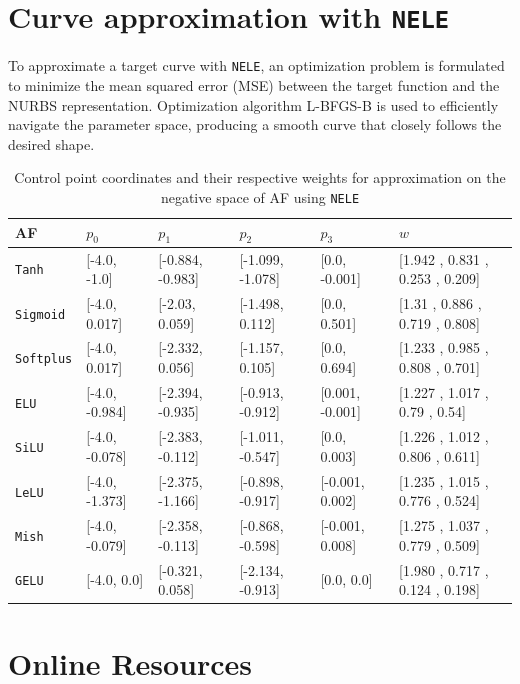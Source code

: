 \documentclass{article}
\begin{document}
\section{Curve approximation with \texttt{NELE}\label{app:nurbsparams}}
To approximate a target curve with \texttt{NELE}, an optimization problem is formulated to minimize the mean squared error (MSE) between the target function and the NURBS representation.
Optimization algorithm L-BFGS-B \cite{scipy_optimize_minimize} is used to efficiently navigate the parameter space, 
producing a smooth curve that closely follows the desired shape.
\begin{table}[H]
  \caption{Control point coordinates and their respective weights for approximation on the negative space of AF using \texttt{NELE}}
  \label{tab:curveapprox}
  \centering
\scriptsize
  \begin{tabular}{@{}llllll@{}}
    \toprule
    AF&$p_0$&$p_1$&$p_2$&$p_3$&$w$\\
    \midrule
    \texttt{Tanh} & [-4.0, -1.0] &    [-0.884, -0.983] &    [-1.099, -1.078] &    [0.0, -0.001] &    [1.942 , 0.831 , 0.253 , 0.209]\\
    \texttt{Sigmoid} & [-4.0, 0.017] &    [-2.03, 0.059] &    [-1.498, 0.112] &    [0.0, 0.501] &    [1.31 , 0.886 , 0.719 , 0.808]\\
    \texttt{Softplus} & [-4.0, 0.017] &    [-2.332, 0.056] &    [-1.157, 0.105] &    [0.0, 0.694] &    [1.233 , 0.985 , 0.808 , 0.701]\\
    \texttt{ELU} & [-4.0, -0.984] &    [-2.394, -0.935] &    [-0.913, -0.912] &    [0.001, -0.001] &    [1.227 , 1.017 , 0.79 , 0.54]\\
    \texttt{SiLU} & [-4.0, -0.078] &    [-2.383, -0.112] &    [-1.011, -0.547] &    [0.0, 0.003] &    [1.226 , 1.012 , 0.806 , 0.611]\\
    \texttt{LeLU} & [-4.0, -1.373] &    [-2.375, -1.166] &    [-0.898, -0.917] &    [-0.001, 0.002] &    [1.235 , 1.015 , 0.776 , 0.524]\\
    \texttt{Mish} & [-4.0, -0.079] &    [-2.358, -0.113] &    [-0.868, -0.598] &    [-0.001, 0.008] &    [1.275 , 1.037 , 0.779 , 0.509]\\
    \texttt{GELU} & [-4.0, 0.0] &    [-0.321, 0.058] &    [-2.134, -0.913] &    [0.0, 0.0] &    [1.980 , 0.717 , 0.124 , 0.198]\\
  \bottomrule
\end{tabular}
\end{table}

\section{Online Resources}
\end{document}
